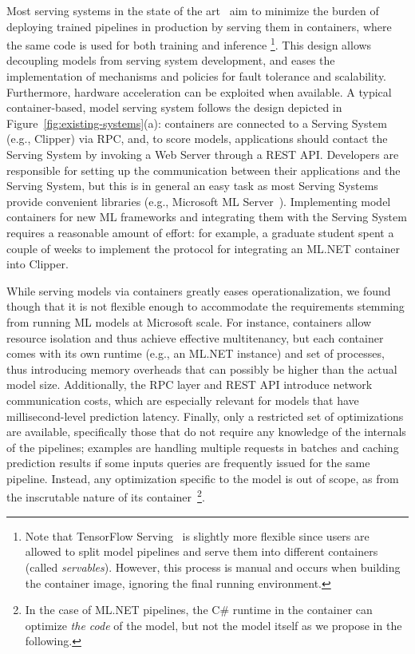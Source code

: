 \documentclass[11pt]{article}
\newcommand{\mlnet}{ML.NET\xspace}
\newcommand{\stitle}[1]{\noindent{\bf #1}}
\begin{document}
Most serving systems in the state of the art~\cite{clipper, msftmlserver, mms, tf-serving, clipper-nsdi, tf-serving2} aim to minimize the burden of deploying trained pipelines in production by serving them in containers, where the same code is used for both training and inference \footnote{Note that TensorFlow Serving~\cite{tf-serving} is slightly more flexible since users are allowed to split model pipelines and serve them into different containers (called \emph{servables}). However, this process is manual and occurs when building the container image, ignoring the final running environment.}.
This design allows decoupling models from serving system development, and eases the implementation of mechanisms and policies for fault tolerance and scalability.
Furthermore, hardware acceleration can be exploited when available.
A typical container-based, model serving system follows the design depicted in Figure~\ref{fig:existing-systems}(a): containers are connected to a Serving System (e.g., Clipper) via RPC, and, to score models, applications should contact the Serving System by invoking a Web Server through a REST API. Developers are responsible for setting up the communication between their applications and the Serving System, but this is in general an easy task as most Serving Systems provide convenient libraries (e.g., Microsoft ML Server~\cite{msftmlserver}).
Implementing model containers for new ML frameworks and integrating them with the Serving System requires a reasonable amount of effort: for example, a graduate student spent a couple of weeks to implement the protocol for integrating an \mlnet container into Clipper.  

\stitle{Limitations.}
While serving models via containers greatly eases operationalization, we found though that it is not flexible enough to accommodate the requirements stemming from running ML models at Microsoft scale. 
For instance, containers allow resource isolation and thus achieve effective multitenancy, but each container comes with its own runtime (e.g., an \mlnet instance) and set of processes, thus introducing memory overheads that can possibly be higher than the actual model size.
Additionally, the RPC layer and REST API introduce network communication costs, which are especially relevant for models that have millisecond-level prediction latency.
Finally, only a restricted set of optimizations are available, specifically those that do not require any knowledge of the internals of the pipelines; examples are handling multiple requests in batches and caching prediction results if some inputs queries are frequently issued for the same pipeline.
Instead, any optimization specific to the model is out of scope, as from the inscrutable nature of its container~\footnote{In the case of \mlnet pipelines, the C\# runtime in the container can optimize \emph{the code} of the model, but not the model itself as we propose in the following.}.
 
\end{document}

